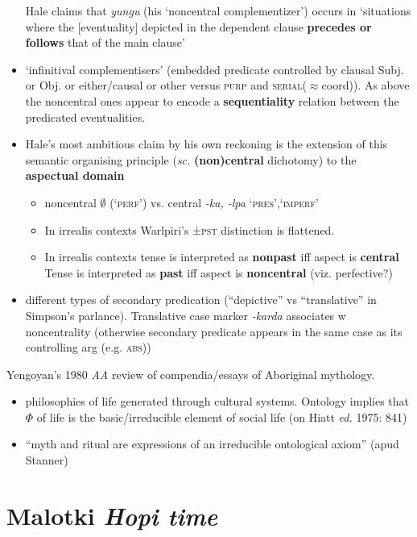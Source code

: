 \documentclass[10pt]{article}
\begin{document}
\begin{itemize}
	Hale claims that \textit{yungu} (his `noncentral complementizer') occurs in `situations where the [eventuality] depicted in the dependent clause \textbf{precedes or follows} that of the main clause'
	\item `infinitival complementisers' (embedded predicate controlled by clausal Subj. or Obj. or either/causal or other versus \textsc{purp} and \textsc{serial}($\approx$coord)). As above the noncentral ones appear to encode a \textbf{sequentiality} relation between the predicated eventualities.
	\item Hale's most ambitious claim by his own reckoning is the extension of this semantic organising principle (\textit{sc.} \textbf{(non)central} dichotomy) to the \textbf{aspectual domain}
	\begin{itemize}
		\item noncentral $\emptyset$ (\textsc{`perf'}) vs. central \textit{-ka, -lpa} \textsc{`pres',`imperf'}
		\item In irrealis contexts Warlpiri's ±\textsc{pst} distinction is flattened.
		\item In irrealis contexts tense is interpreted as \textbf{nonpast} iff aspect is \textbf{central}\\
		Tense is interpreted as \textbf{past} iff aspect is \textbf{noncentral} (viz. perfective?)
	\end{itemize}
	\item different types of secondary predication (``depictive'' vs ``translative'' in Simpson's parlance). Translative case marker \textit{-karda} associates w noncentrality (otherwise secondary predicate appears in the same case as its controlling arg (e.g. \textsc{abs}))
	\end{itemize}
\begin{framed}
Yengoyan's 1980 \textit{AA} review of compendia/essays of Aboriginal mythology.
	\begin{itemize}
		\item  philosophies of life generated through cultural systems. Ontology implies that $\Phi$ of life is the basic/irreducible element of social life (on Hiatt \textit{ed. }1975: 841)
		\item ``myth and ritual are expressions of an irreducible ontological axiom'' (apud Stanner)
	\end{itemize}\end{framed}

\section{Malotki \textit{Hopi time}}
\end{document}
